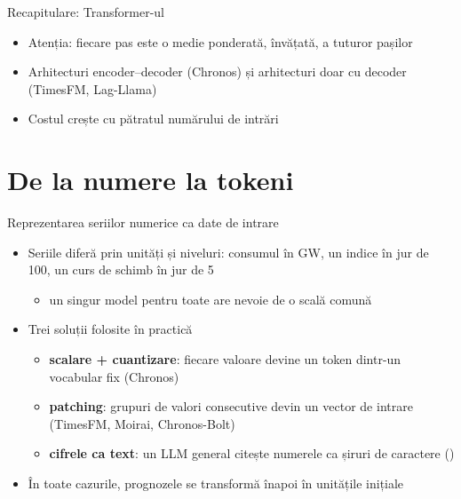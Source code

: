 \begin{frame}{Recapitulare: Transformer-ul}
\itemsize{\small}
\begin{itemize}
    \item Atenția: fiecare pas este o medie ponderată, învățată, a tuturor pașilor
    \item Arhitecturi encoder--decoder (Chronos) și arhitecturi doar cu decoder (TimesFM, Lag-Llama)
    \item Costul crește cu pătratul numărului de intrări
\end{itemize}
\end{frame}


\section{De la numere la tokeni}

\begin{frame}{Reprezentarea seriilor numerice ca date de intrare}
\itemsize{\small}
\begin{itemize}
    \item Seriile diferă prin unități și niveluri: consumul în GW, un indice în jur de 100, un curs de schimb în jur de 5
    \begin{itemize}
        \item un singur model pentru toate are nevoie de o scală comună
    \end{itemize}
    \item Trei soluții folosite în practică
    \begin{itemize}
        \item \textbf{scalare + cuantizare}: fiecare valoare devine un token dintr-un vocabular fix (Chronos)
        \item \textbf{patching}: grupuri de valori consecutive devin un vector de intrare (TimesFM, Moirai, Chronos-Bolt)
        \item \textbf{cifrele ca text}: un LLM general citește numerele ca șiruri de caractere ()
    \end{itemize}
    \item În toate cazurile, prognozele se transformă înapoi în unitățile inițiale
\end{itemize}
\end{frame}

